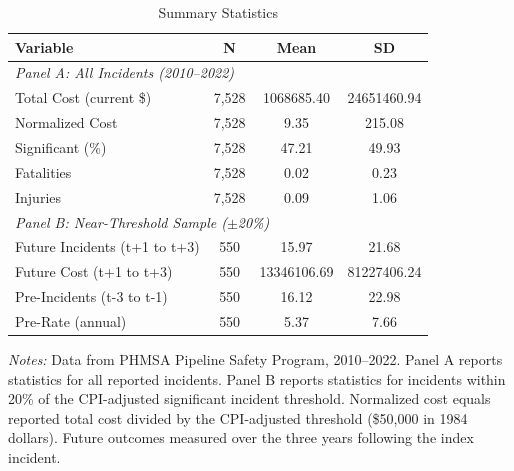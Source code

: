\begin{table}[htbp]
\centering
\caption{Summary Statistics}
\label{tab:summary}
\begin{tabular}{lccc}
\hline\hline
Variable & N & Mean & SD \\
\hline
\multicolumn{4}{l}{\textit{Panel A: All Incidents (2010--2022)}} \\
Total Cost (current \$) & 7,528 & 1068685.40 & 24651460.94 \\
Normalized Cost & 7,528 & 9.35 & 215.08 \\
Significant (\%) & 7,528 & 47.21 & 49.93 \\
Fatalities & 7,528 & 0.02 & 0.23 \\
Injuries & 7,528 & 0.09 & 1.06 \\
\hline
\multicolumn{4}{l}{\textit{Panel B: Near-Threshold Sample ($\pm$20\%)}} \\
Future Incidents (t+1 to t+3) & 550 & 15.97 & 21.68 \\
Future Cost (t+1 to t+3) & 550 & 13346106.69 & 81227406.24 \\
Pre-Incidents (t-3 to t-1) & 550 & 16.12 & 22.98 \\
Pre-Rate (annual) & 550 & 5.37 & 7.66 \\
\hline\hline
\end{tabular}
\par\vspace{0.3em}
{\small
\textit{Notes:} Data from PHMSA Pipeline Safety Program, 2010--2022.  Panel A reports statistics for all reported incidents.  Panel B reports statistics for incidents within 20\% of the CPI-adjusted  significant incident threshold. Normalized cost equals reported total cost  divided by the CPI-adjusted threshold (\$50,000 in 1984 dollars).  Future outcomes measured over the three years following the index incident.
}
\end{table}
